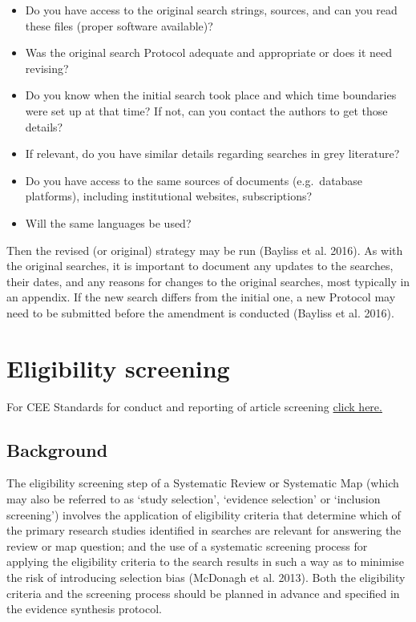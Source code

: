\documentclass[
  letterpaper,
  DIV=11,
  numbers=noendperiod]{scrreprt}
\begin{document}
\begin{itemize}
\item
  Do you have access to the original search strings, sources, and can
  you read these files (proper software available)?
\item
  Was the original search Protocol adequate and appropriate or does it
  need revising?
\item
  Do you know when the initial search took place and which time
  boundaries were set up at that time? If not, can you contact the
  authors to get those details?
\item
  If relevant, do you have similar details regarding searches in grey
  literature?
\item
  Do you have access to the same sources of documents (e.g.~database
  platforms), including institutional websites, subscriptions?
\item
  Will the same languages be used?
\end{itemize}

Then the revised (or original) strategy may be run (Bayliss et al.
2016). As with the original searches, it is important to document any
updates to the searches, their dates, and any reasons for changes to the
original searches, most typically in an appendix. If the new search
differs from the initial one, a new Protocol may need to be submitted
before the amendment is conducted (Bayliss et al. 2016).


\chapter{Eligibility screening}\label{eligibility-screening}

For CEE Standards for conduct and reporting of article screening
\href{https://environmentalevidence.org/standards-table/}{click here.}

\section{Background}\label{sec-chapt5}

The eligibility screening step of a Systematic Review or Systematic Map
(which may also be referred to as `study selection', `evidence
selection' or `inclusion screening') involves the application of
eligibility criteria that determine which of the primary research
studies identified in searches are relevant for answering the review or
map question; and the use of a systematic screening process for applying
the eligibility criteria to the search results in such a way as to
minimise the risk of introducing selection bias (McDonagh et al. 2013).
Both the eligibility criteria and the screening process should be
planned in advance and specified in the evidence synthesis protocol.
\end{document}
